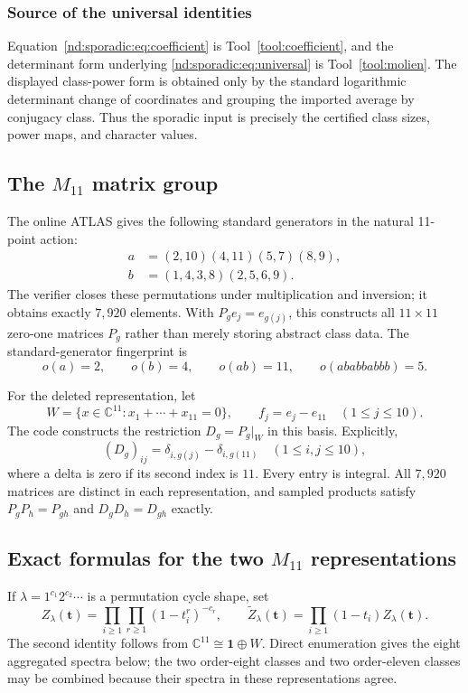 \documentclass[10pt]{article}
\begin{document}
\subsubsection*{Source of the universal identities}
Equation~\eqref{nd:sporadic:eq:coefficient} is Tool~\ref{tool:coefficient},
and the determinant form underlying
\eqref{nd:sporadic:eq:universal} is Tool~\ref{tool:molien}.  The displayed
class-power form is obtained only by the standard logarithmic determinant
change of coordinates and grouping the imported average by conjugacy class.
Thus the sporadic input is precisely the certified class sizes, power maps,
and character values.

\subsection{The \texorpdfstring{$M_{11}$}{M11} matrix group}

The online ATLAS gives the following standard generators in the natural
11-point action:
\begin{align*}
a&=(2,10)(4,11)(5,7)(8,9),\\
b&=(1,4,3,8)(2,5,6,9).
\end{align*}
The verifier closes these permutations under multiplication and inversion;
it obtains exactly $7{,}920$ elements.  With $P_ge_j=e_{g(j)}$, this constructs
all $11\times11$ zero-one matrices $P_g$ rather than merely storing abstract
class data.  The standard-generator fingerprint is
\[
o(a)=2,\qquad o(b)=4,\qquad o(ab)=11,\qquad
o(ababbabbb)=5.
\]

For the deleted representation, let
\[
W=\{x\in\mathbb C^{11}:x_1+\cdots+x_{11}=0\},\qquad
f_j=e_j-e_{11}\quad(1\leq j\leq10).
\]
The code constructs the restriction $D_g=P_g|_W$ in this basis.  Explicitly,
\begin{equation}\label{nd:sporadic:eq:deleted-matrix}
(D_g)_{ij}=\delta_{i,g(j)}-\delta_{i,g(11)}
\quad(1\leq i,j\leq10),
\end{equation}
where a delta is zero if its second index is $11$.  Every entry is integral.
All $7{,}920$ matrices are distinct in each representation, and sampled
products satisfy $P_gP_h=P_{gh}$ and $D_gD_h=D_{gh}$ exactly.

\subsection{Exact formulas for the two \texorpdfstring{$M_{11}$}{M11} representations}

If $\lambda=1^{c_1}2^{c_2}\cdots$ is a permutation cycle shape, set
\[
Z_\lambda(\mathbf t)=\prod_{i\geq1}\prod_{r\geq1}
(1-t_i^r)^{-c_r},\qquad
\widetilde Z_\lambda(\mathbf t)=\prod_{i\geq1}(1-t_i)Z_\lambda(\mathbf t).
\]
The second identity follows from
$\mathbb C^{11}\cong\mathbf1\oplus W$.  Direct enumeration gives the eight
aggregated spectra below; the two order-eight classes and two order-eleven
classes may be combined because their spectra in these representations agree.
\end{document}
